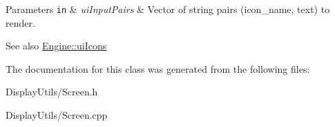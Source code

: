 \begin{DoxyParams}[1]{Parameters}
\mbox{\tt in}  & {\em ui\+Input\+Pairs} & Vector of string pairs (icon\+\_\+name, text) to render. \\
\hline
\end{DoxyParams}
\begin{DoxySeeAlso}{See also}
\mbox{\hyperlink{namespaceEngine_ae562ecbc72c843b594695a058487d3cb}{Engine\+::ui\+Icons}} 
\end{DoxySeeAlso}


The documentation for this class was generated from the following files\+:\begin{DoxyCompactItemize}
\item 
Display\+Utils/Screen.\+h\item 
Display\+Utils/Screen.\+cpp\end{DoxyCompactItemize}
